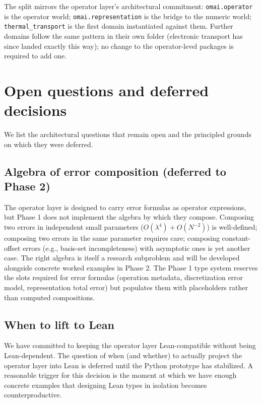 \documentclass[11pt,a4paper]{article}
\begin{document}
\noindent The split mirrors the operator layer's architectural commitment: \texttt{omai.operator}
is the operator world; \texttt{omai.representation} is the bridge to the numeric world;
\texttt{thermal\_transport} is the first domain instantiated against them. Further
domains follow the same pattern in their own folder (electronic transport has
since landed exactly this way); no change to the operator-level packages is
required to add one.

\section{Open questions and deferred decisions}
\label{sec:open}

We list the architectural questions that remain open and the principled grounds on which they
were deferred.

\subsection{Algebra of error composition (deferred to Phase 2)}

The operator layer is designed to carry error formulas as operator expressions, but Phase 1 does not
implement the algebra by which they compose. Composing two errors in independent small parameters
($O(\lambda^4) + O(N^{-2})$) is well-defined; composing two errors in the same parameter requires
care; composing constant-offset errors (e.g., basis-set incompleteness) with asymptotic ones is
yet another case. The right algebra is itself a research subproblem and will be developed
alongside concrete worked examples in Phase 2. The Phase 1 type system reserves the slots
required for error formulas (operation metadata, discretization error model, representation
total error) but populates them with placeholders rather than computed compositions.

\subsection{When to lift to Lean}

We have committed to keeping the operator layer Lean-compatible without being Lean-dependent. The
question of when (and whether) to actually project the operator layer into Lean is deferred until
the Python prototype has stabilized. A reasonable trigger for this decision is the moment at
which we have enough concrete examples that designing Lean types in isolation becomes
counterproductive.
\end{document}
